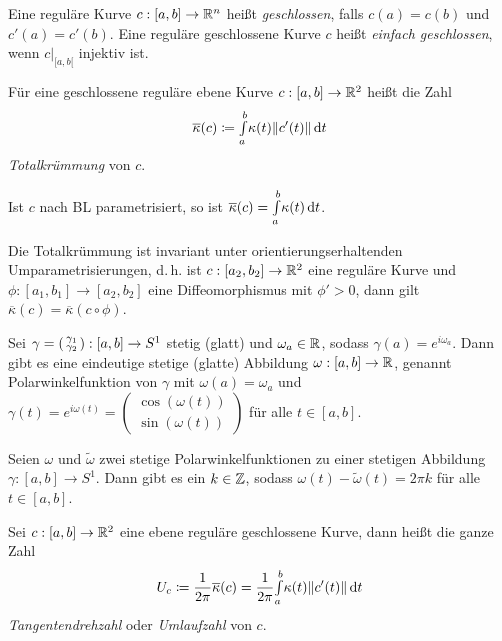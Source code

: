 \documentclass{cheat-sheet}
\newcommand{\Intabdt}[1]{\Int{a}{b}{#1}{t}}
\begin{document}
\begin{defn}
  Eine reguläre Kurve $c : [a, b] \to \mathbb{R}^n$ heißt \emph{geschlossen}, falls $c(a) = c(b)$ und $c'(a) = c'(b)$.
  Eine reguläre geschlossene Kurve $c$ heißt \emph{einfach geschlossen}, wenn $c|_{[a, b[}$ injektiv ist.
\end{defn}

\begin{defn}
  Für eine geschlossene reguläre ebene Kurve $c : [a, b] \to \mathbb{R}^2$ heißt die Zahl
  \[ \overline{\kappa}(c) \coloneqq \Intabdt{\kappa(t) \| c'(t) \|} \]
  \emph{Totalkrümmung} von $c$.
\end{defn}

\begin{bem}
  Ist $c$ nach BL parametrisiert, so ist $\overline{\kappa}(c) = \Intabdt{\kappa(t)}$.
\end{bem}

\begin{satz}
  Die Totalkrümmung ist invariant unter orientierungserhaltenden Umparametrisierungen, d.\,h. ist $c : [a_2, b_2] \to \mathbb{R}^2$ eine reguläre Kurve und $\phi : [a_1, b_1] \to [a_2, b_2]$ eine Diffeomorphismus mit $\phi' > 0$, dann gilt $\overline\kappa(c) = \overline\kappa(c \circ \phi)$.
\end{satz}

\begin{satz}
  Sei $\gamma = \begin{psmallmatrix} \gamma_1 \\ \gamma_2 \end{psmallmatrix} : [a, b] \to S^1$ stetig (glatt) und $\omega_a \in \mathbb{R}$, sodass $\gamma(a) = e^{i \omega_a}$. Dann gibt es eine eindeutige stetige (glatte) Abbildung $\omega : [a, b] \to \mathbb{R}$, genannt Polarwinkelfunktion von $\gamma$ mit $\omega(a) = \omega_a$ und $\gamma(t) = e^{i \omega(t)} = \begin{pmatrix} \cos(\omega(t)) \\ \sin(\omega(t)) \end{pmatrix}$ für alle $t \in [a, b]$.
\end{satz}

\begin{satz}
  Seien $\omega$ und $\tilde\omega$ zwei stetige Polarwinkelfunktionen zu einer stetigen Abbildung $\gamma : [a, b] \to S^1$. Dann gibt es ein $k \in \mathbb{Z}$, sodass $\omega(t) - \tilde\omega(t) = 2 \pi k$ für alle $t \in [a, b]$.
\end{satz}

\begin{satz}
  Sei $c : [a, b] \to \mathbb{R}^2$ eine ebene reguläre geschlossene Kurve, dann heißt die ganze Zahl
  \[ U_c \coloneqq \frac{1}{2 \pi} \overline\kappa(c) = \frac{1}{2 \pi} \Intabdt{\kappa(t) \| c'(t) \|} \]
  \emph{Tangentendrehzahl} oder \emph{Umlaufzahl} von $c$.
\end{satz}
\end{document}
